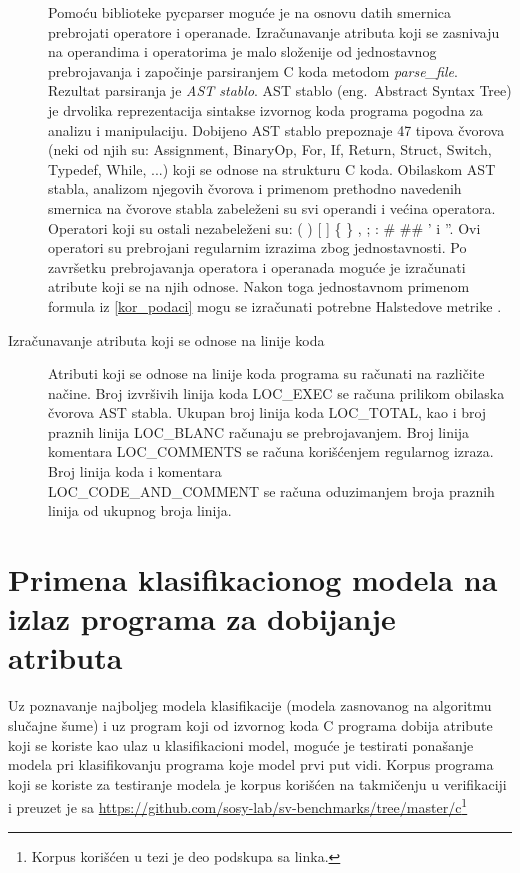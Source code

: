 \documentclass[12pt,oneside]{memoir}
\begin{document}
\begin{description}
Pomoću biblioteke pycparser moguće je na osnovu datih smernica prebrojati operatore i operanade. Izračunavanje atributa koji se zasnivaju na operandima i operatorima je malo složenije od jednostavnog prebrojavanja i započinje parsiranjem C koda metodom \textit{parse\_file}. Rezultat parsiranja je \textit{AST stablo}. AST stablo (eng.~Abstract Syntax Tree) je drvolika reprezentacija sintakse izvornog koda programa pogodna za analizu i manipulaciju. Dobijeno AST stablo prepoznaje 47 tipova čvorova (neki od njih su: Assignment, BinaryOp, For, If, Return, Struct, Switch, Typedef, While, ...) koji se odnose na strukturu C koda. Obilaskom AST stabla, analizom njegovih čvorova i primenom prethodno navedenih smernica na čvorove stabla zabeleženi su svi operandi i većina operatora. Operatori koji su ostali nezabeleženi su: ( ) [ ] \{ \} , ; : \# \#\# ' i ''. Ovi operatori su prebrojani regularnim izrazima zbog jednostavnosti. Po završetku prebrojavanja operatora i operanada moguće je izračunati atribute koji se na njih odnose. Nakon toga jednostavnom primenom formula iz \ref{kor_podaci} mogu se izračunati potrebne Halstedove metrike \cite{pycparser}.

\item[Izračunavanje atributa koji se odnose na linije koda]

Atributi koji se odnose na linije koda programa su računati na različite načine. Broj izvršivih linija koda LOC\_EXEC se računa prilikom obilaska čvorova AST stabla. Ukupan broj linija koda LOC\_TOTAL, kao i broj praznih linija LOC\_BLANC računaju se prebrojavanjem. Broj linija komentara LOC\_COMMENTS se računa korišćenjem regularnog izraza. Broj linija koda i komentara \\LOC\_CODE\_AND\_COMMENT se računa oduzimanjem broja praznih linija od ukupnog broja linija. 

\end{description}

\section{Primena klasifikacionog modela na izlaz programa za dobijanje atributa}

Uz poznavanje najboljeg modela klasifikacije (modela zasnovanog na algoritmu slučajne šume) i uz program koji od izvornog koda C programa dobija atribute koji se koriste kao ulaz u klasifikacioni model, moguće je testirati ponašanje modela pri klasifikovanju programa koje model prvi put vidi. Korpus programa koji se koriste za testiranje modela je korpus korišćen na takmičenju u verifikaciji i preuzet je sa \url{https://github.com/sosy-lab/sv-benchmarks/tree/master/c}\footnote{Korpus korišćen u tezi je deo podskupa sa linka.}
\end{document}

